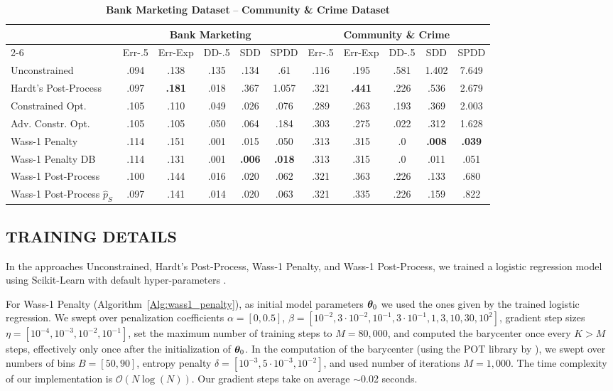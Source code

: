 \documentclass[letterpaper]{article}
\newcommand\boldblue[1]{\textcolor{lowblue}{\textbf{#1}}}
\newcommand\boldred[1]{\textcolor{lowred}{\textbf{#1}}}
\theoremstyle{definition}
\begin{document}
\begin{table}
\setlength{\tabcolsep}{5pt}
\caption{{\bf Bank Marketing Dataset} -- {\bf Community \& Crime Dataset}}
\begin{center}
\begin{tabular}{lccccc|ccccc}
&\multicolumn{5}{c}{Bank Marketing}&\multicolumn{5}{c}{Community \& Crime}\\
\cline{2-6}\cline{7-11}
& Err-.5 & Err-Exp & DD-.5 & SDD & SPDD & Err-.5 & Err-Exp & DD-.5 & SDD  & SPDD\\
\toprule
Unconstrained        & .094 & .138 & .135 & .134  & .61 & .116 & .195 & .581 &1.402 &7.649\\
Hardt's Post-Process & .097 & \boldred{.181} & .018 & .367  &1.057& .321 & \boldred{.441} & .226 & .536 &2.679\\
Constrained Opt.     & .105 & .110 & .049 & .026  & .076& .289 & .263 & .193 & .369 &2.003\\
Adv. Constr. Opt.    & .105 & .105 & .050 & .064  & .184& .303 & .275 & .022 & .312 &1.628\\
Wass-1 Penalty       & .114 & .151 & .001 &.015 &.050 & .313 & .315 & .0   & \boldblue{.008} & \boldblue{.039}\\
Wass-1 Penalty DB    & .114 & .131 & .001 &\boldblue{.006}&\boldblue{.018}& .313 & .315 & .0   & .011 & .051\\
Wass-1 Post-Process  & .100 & .144 & .016 & .020  & .062& .321 & .363 & .226 & .133 & .680\\
Wass-1 Post-Process $\hat p_{S}$  & .097 & .141 & .014 & .020  & .063& .321 & .335 & .226 & .159 & .822\\
\bottomrule
\end{tabular}
\end{center}
\label{table:Bank&Crime}
\end{table}

\subsection{TRAINING DETAILS} 
In the approaches Unconstrained, Hardt's Post-Process, Wass-1 Penalty, and Wass-1 Post-Process, we trained a logistic regression model using Scikit-Learn with default hyper-parameters \citep{pedregosa11scikit-learn}. 

For Wass-1 Penalty (Algorithm~\ref{Alg:wass1_penalty}), as initial model parameters ${\bm{\theta}}_0$ we used the ones given by the trained logistic regression. We swept over penalization coefficients $\alpha=[0, 0.5]$, $\beta=[10^{-2}, 3\cdot 10^{-2}, 10^{-1}, 3\cdot 10^{-1}, 1, 3, 10, 30, 10^2]$, gradient step sizes $\eta=[10^{-4}, 10^{-3}, 10^{-2}, 10^{-1}]$, set the maximum number of training steps to $M=80,000$, and computed the barycenter once every $K>M$ steps, effectively only once after the initialization of ${\bm{\theta}}_0$.
In the computation of the barycenter (using the POT library by \cite{flamary2017pot}), we swept over numbers of bins $B = [50, 90]$, entropy penalty $\delta = [10^{-3}, 5\cdot 10^{-3}, 10^{-2}]$, and used number of iterations $M=1,000$. The time complexity of our implementation is $\mathcal{O}(N \log(N))$. Our gradient steps take on average $\sim$0.02 seconds. 
\end{document}
